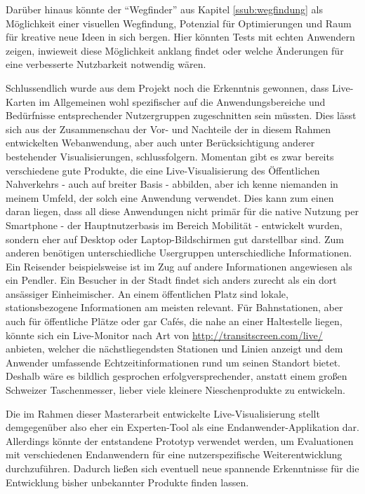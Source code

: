 \begin{newpage}
    Darüber hinaus könnte der "`Wegfinder"' aus Kapitel \ref{ssub:wegfindung} als Möglichkeit einer visuellen Wegfindung, Potenzial für Optimierungen und Raum für kreative neue Ideen in sich bergen. Hier könnten Tests mit echten Anwendern zeigen, inwieweit diese Möglichkeit anklang findet oder welche Änderungen für eine verbesserte Nutzbarkeit notwendig wären.

    Schlussendlich wurde aus dem Projekt noch die Erkenntnis gewonnen, dass Live-Karten im Allgemeinen wohl spezifischer auf die Anwendungsbereiche und Bedürfnisse entsprechender Nutzergruppen zugeschnitten sein müssten. Dies lässt sich aus der Zusammenschau der Vor- und Nachteile der in diesem Rahmen entwickelten Webanwendung, aber auch unter Berücksichtigung anderer bestehender Visualisierungen, schlussfolgern. Momentan gibt es zwar bereits verschiedene gute Produkte, die eine Live-Visualisierung des Öffentlichen Nahverkehrs - auch auf breiter Basis - abbilden, aber ich kenne niemanden in meinem Umfeld, der solch eine Anwendung verwendet. Dies kann zum einen daran liegen, dass all diese Anwendungen nicht primär für die native Nutzung per Smartphone - der Hauptnutzerbasis im Bereich Mobilität - entwickelt wurden, sondern eher auf Desktop oder Laptop-Bildschirmen gut darstellbar sind. Zum anderen benötigen unterschiedliche Usergruppen unterschiedliche Informationen. Ein Reisender beispielsweise ist im Zug auf andere Informationen angewiesen als ein Pendler. Ein Besucher in der Stadt findet sich anders zurecht als ein dort ansässiger Einheimischer. An einem öffentlichen Platz sind lokale, stationsbezogene Informationen am meisten relevant. Für Bahnstationen, aber auch für öffentliche Plätze oder gar Cafés, die nahe an einer Haltestelle liegen, könnte sich ein Live-Monitor nach Art von \url{http://transitscreen.com/live/} anbieten, welcher die nächstliegendsten Stationen und Linien anzeigt und dem Anwender umfassende Echtzeitinformationen rund um seinen Standort bietet. Deshalb wäre es bildlich gesprochen erfolgversprechender, anstatt einem großen Schweizer Taschenmesser, lieber viele kleinere Nieschenprodukte zu entwickeln. 

    Die im Rahmen dieser Masterarbeit entwickelte Live-Visualisierung stellt demgegenüber also eher ein Experten-Tool als eine Endanwender-Applikation dar. Allerdings könnte der entstandene Prototyp verwendet werden, um Evaluationen mit verschiedenen Endanwendern für eine nutzerspezifische Weiterentwicklung durchzuführen. Dadurch ließen sich eventuell neue spannende Erkenntnisse für die Entwicklung bisher unbekannter Produkte finden lassen.

\end{newpage}